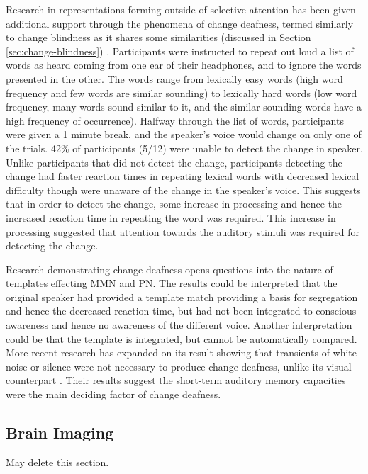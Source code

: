 Research in representations forming outside of selective attention has been given additional support through the phenomena of change deafness, termed similarly to change blindness as it shares some similarities (discussed in Section \ref{sec:change-blindness}) \cite{Vitevitch2000}.  Participants were instructed to repeat out loud a list of words as heard coming from one ear of their headphones, and to ignore the words presented in the other.  The words range from lexically easy words (high word frequency and few words are similar sounding) to lexically hard words (low word frequency, many words sound similar to it, and the similar sounding words have a high frequency of occurrence).  Halfway through the list of words, participants were given a 1 minute break, and the speaker's voice would change on only one of the trials.  42\% of participants (5/12) were unable to detect the change in speaker.  Unlike participants that did not detect the change, participants detecting the change had faster reaction times in repeating lexical words with decreased lexical difficulty though were unaware of the change in the speaker's voice.  This suggests that in order to detect the change, some increase in processing and hence the increased reaction time in repeating the word was required.  This increase in processing suggested that attention towards the auditory stimuli was required for detecting the change.  

Research demonstrating change deafness opens questions into the nature of templates effecting MMN and PN.  The results could be interpreted that the original speaker had provided a template match providing a basis for segregation and hence the decreased reaction time, but had not been integrated to conscious awareness and hence no awareness of the different voice.  Another interpretation could be that the template is integrated, but cannot be automatically compared.  More recent research has expanded on its result showing that transients of white-noise or silence were not necessary to produce change deafness, unlike its visual counterpart \cite{TURATTO2008}.  Their results suggest the short-term auditory memory capacities were the main deciding factor of change deafness.  

\subsection{Brain Imaging}

May delete this section.

